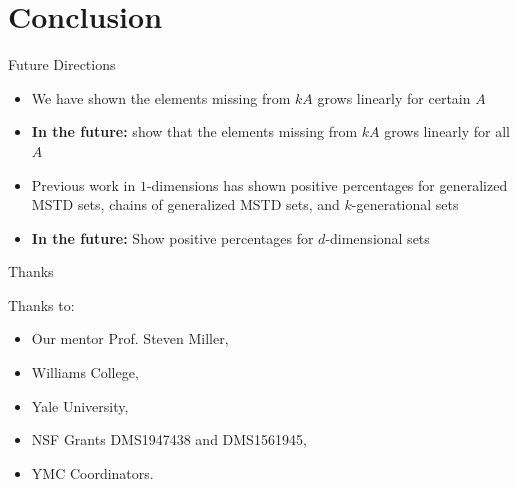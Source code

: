 \documentclass[11pt]{beamer}
\begin{document}
\section{Conclusion}

\begin{frame}{Future Directions}
\begin{itemize}
    \item We have shown the elements missing from $kA$ grows linearly for certain $A$ 
    
    \pause
    \bigskip
    
    \item \textbf{In the future: } show that the elements missing from  $kA$ grows linearly for all $A$ 
    
    \pause
    \bigskip
    
    \item Previous work in $1$-dimensions has shown positive percentages for generalized MSTD sets, chains of generalized MSTD sets, and $k$-generational sets
    
    \pause
    \bigskip
    
    \item \textbf{In the future: } Show positive percentages for $d$-dimensional sets
\end{itemize}

\end{frame}


\begin{frame}{Thanks}

Thanks to:
\begin{itemize}
\item Our mentor Prof. Steven Miller,
    \smallskip
\item Williams College,
    \smallskip
\item Yale University,
    \smallskip
\item NSF Grants DMS1947438 and DMS1561945,
    \smallskip
\item YMC Coordinators.
\end{itemize}

\end{frame}

\end{document}
